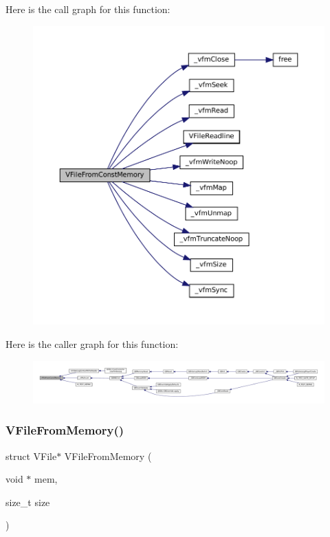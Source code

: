 Here is the call graph for this function\+:
\nopagebreak
\begin{figure}[H]
\begin{center}
\leavevmode
\includegraphics[width=350pt]{vfs-mem_8c_a45c0959a6de2f83dc17c5b00b93352f3_cgraph}
\end{center}
\end{figure}
Here is the caller graph for this function\+:
\nopagebreak
\begin{figure}[H]
\begin{center}
\leavevmode
\includegraphics[width=350pt]{vfs-mem_8c_a45c0959a6de2f83dc17c5b00b93352f3_icgraph}
\end{center}
\end{figure}
\mbox{\label{vfs-mem_8c_abb2d34da3df9c1711f0d6c04adc7c084}} 
\subsubsection{\texorpdfstring{V\+File\+From\+Memory()}{VFileFromMemory()}}
{\footnotesize\ttfamily struct V\+File$\ast$ V\+File\+From\+Memory (\begin{DoxyParamCaption}\item[{void $\ast$}]{mem,  }\item[{size\+\_\+t}]{size }\end{DoxyParamCaption})}

